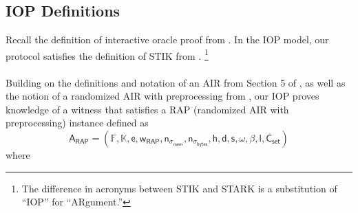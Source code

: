 \documentclass[10pt,letterpaper,titlepage]{article}
\theoremstyle{definition}
\begin{document}
\subsection{IOP Definitions}
Recall the definition of interactive oracle proof from \cite{iop}. 
In the IOP model, our protocol satisfies the definition of STIK from \cite{stark}.%
\footnote{The difference in acronyms between STIK and STARK is a substitution of ``IOP'' for ``ARgument.''} 
\\
\label{IOP notation}
\label{AIR}
\\
Building on the definitions and notation of an AIR from Section 5 of \cite{ethSTARK}, as well as the notion of a randomized AIR with preprocessing from \cite{RAP}, our IOP proves knowledge of a witness that satisfies a RAP\cite{RAP} (randomized AIR with preprocessing) instance defined as
\[\mathsf{A_{RAP}} = (
  \mathbb{F}, 
  \mathbb{K}, 
  \mathsf{e},
  \mathsf{w}_\mathsf{RAP}, 
  \mathsf{n}_{\sigma_\mathsf{mem}}, 
  \mathsf{n}_{\sigma_\mathsf{bytes}}, 
  \mathsf{h}, 
  \mathsf{d}, 
  \mathsf{s}, 
  \omega,
  \beta, 
  \mathsf{l}, 
  \mathsf{C}_\mathsf{set})\] where 
\end{document}
